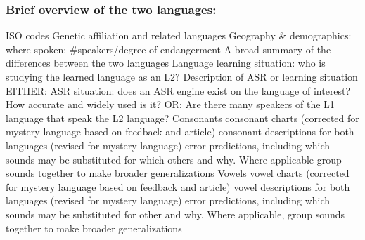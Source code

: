 \documentclass[12pt]{article}
\begin{document}
\subsubsection*{Brief overview of the two languages:}
ISO codes
Genetic affiliation and related languages
Geography & demographics: where spoken; #speakers/degree of endangerment
A broad summary of the differences between the two languages
Language learning situation: who is studying the learned language as an L2?
Description of ASR or learning situation
EITHER: ASR situation: does an ASR engine exist on the language of interest? How accurate and widely used is it?
OR: Are there many speakers of the L1 language that speak the L2 language?
Consonants
consonant charts (corrected for mystery language based on feedback and article)
consonant descriptions for both languages (revised for mystery language)
error predictions, including which sounds may be substituted for which others and why. Where applicable group sounds together to make broader generalizations
Vowels
vowel charts (corrected for mystery language based on feedback and article)
vowel descriptions for both languages (revised for mystery language)
error predictions, including which sounds may be substituted for other and why. Where applicable, group sounds together to make broader generalizations
\end{document}
